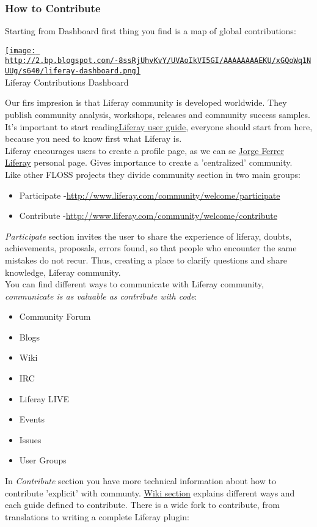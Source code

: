 \subsubsection{ How to Contribute} Starting from Dashboard first thing you find is a map of global contributions:
\begin{tabular}\href{http://2.bp.blogspot.com/-8ssRjUhvKvY/UVAoIkVI5GI/AAAAAAAAEKU/xGQoWq1NUUg/s1600/liferay-dashboard.png}{
\texttt{[image: http://2.bp.blogspot.com/-8ssRjUhvKvY/UVAoIkVI5GI/AAAAAAAAEKU/xGQoWq1NUUg/s640/liferay-dashboard.png]}} \\ 
Liferay Contributions Dashboard
\end{tabular} Our firs impresion is that Liferay community is developed worldwide. They publish community analysis, workshops, releases and community success samples.
\\ It's important to start reading\nolinebreak\href{http://www.liferay.com/documentation/liferay-portal/6.1/user-guide}{Liferay user guide}, everyone should start from here, because you need to know first what Liferay is.
\\ Liferay encourages users to create a profile page, as we can se \href{http://www.liferay.com/web/jorge.ferrer/profile}{Jorge Ferrer Liferay} personal page. Gives importance to create a 'centralized' community.
\\ Like other FLOSS projects they divide community section in two main groups:
\begin{itemize}
	\item Participate -\nolinebreak\href{http://www.liferay.com/community/welcome/participate}{http://www.liferay.com/community/welcome/participate}
	\item Contribute -\nolinebreak\href{http://www.liferay.com/community/welcome/contribute}{http://www.liferay.com/community/welcome/contribute}
\end{itemize}\textit{Participate} section invites the user to share the experience of liferay, doubts, achievements, proposals, errors found, so that people who encounter the same mistakes do not recur. Thus, creating a place to clarify questions and share knowledge, Liferay community.
\\ You can find different ways to communicate with Liferay community, \textit{communicate is as valuable as contribute with code}:
\begin{itemize}
	\item Community Forum
	\item Blogs
	\item Wiki
	\item IRC
	\item Liferay LIVE
	\item Events
	\item Issues
	\item User Groups
\end{itemize} In \textit{Contribute} section you have more technical information about how to contribute 'explicit' with communty. \href{http://www.liferay.com/community/wiki/-/wiki/Main/Contributing}{Wiki section} explains different ways and each guide defined to contribute. There is a wide fork to contribute, from translations to writing a complete Liferay plugin:
